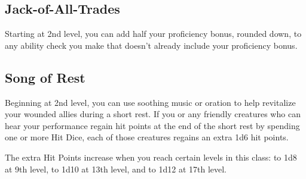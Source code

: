 \documentclass[letterpaper,openany,oneside,twocolumn]{book}
\begin{document}
\subsection*{Jack-of-All-Trades}
Starting at 2nd level, you can add half your proficiency bonus, rounded down, to any ability check you make that doesn't already include your proficiency bonus.
\subsection*{Song of Rest}
Beginning at 2nd level, you can use soothing music or oration to help revitalize your wounded allies during a short rest. If you or any friendly creatures who can hear your performance regain hit points at the end of the short rest by spending one or more Hit Dice, each of those creatures regains an extra 1d6 hit points.

The extra Hit Points increase when you reach certain levels in this class: to 1d8 at 9th level, to 1d10 at 13th level, and to 1d12 at 17th level.
%
%
\end{document}
